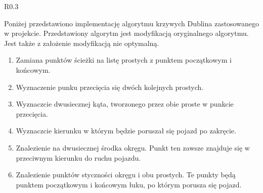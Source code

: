             \begin{wrapfigure}[3]{R}{0.3\textwidth}
                \centering
                \vspace{1cm}
            \end{wrapfigure}

\newpage
            Poniżej przedstawiono implementację algorytmu krzywych Dublina zastosowanego w projekcie.
            Przedstawiony algorytm jest modyfikacją oryginalnego algorytmu.
            Jest także z założenie modyfikacją nie optymalną.

            \vspace{0.25cm}
            \begin{minipage}[l]{0.6\textwidth}
                \begin{enumerate}
                    \item Zamiana punktów ścieżki na listę prostych z punktem początkowym i końcowym.
                    \item Wyznaczenie punku przecięcia się dwóch kolejnych prostych.
                    \item Wyznaczcie dwusiecznej kąta, tworzonego przez obie proste w punkcie przecięcia.
                    \item Wyznaczcie kierunku w którym będzie poruszał się pojazd po zakręcie.
                    \item Znalezienie na dwusiecznej środka okręgu. Punkt ten zawsze znajduje się w przeciwnym kierunku do ruchu pojazdu.
                    \item Znalezienie punktów styczności okręgu i obu prostych. Te punkty będą punktem początkowym i końcowym łuku, po którym porusza się pojazd.
                \end{enumerate}
            \end{minipage}
            \vspace{0.25cm}

